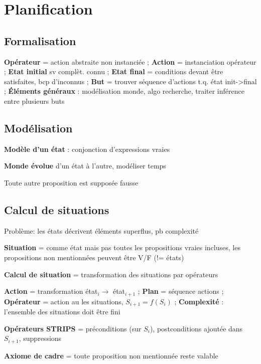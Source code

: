 \section*{Planification}

\subsection*{Formalisation}

\textbf{Opérateur} = action abstraite non instanciée
; \textbf{Action} = instanciation opérateur
; \textbf{Etat initial} sv complèt. connu
; \textbf{Etat final} = conditions devant être satisfaites, bcp d'inconnus
; \textbf{But} = trouver séquence d'actions t.q. état init->final
; \textbf{Éléments généraux} : modélisation monde, algo recherche, traiter inférence entre plusieurs buts

\subsection*{Modélisation}

\textbf{Modèle d'un état} : conjonction d'expressions vraies

\textbf{Monde évolue} d'un état à l'autre, modéliser temps

Toute autre proposition est supposée fausse

\subsection*{Calcul de situations}

Problème: les états décrivent éléments superflus, pb complexité 

\textbf{Situation} = comme état mais pas toutes les propositions vraies incluses, les propositions non mentionnées peuvent être V/F (!= états)

\textbf{Calcul de situation} = transformation des situations par opérateurs

\textbf{Action} = transformation état$_i \rightarrow$ état$_{i+1}$
; \textbf{Plan} = séquence actions
; \textbf{Opérateur} = action au les situations, $S_{i+1} = f(S_i)$
; \textbf{Complexité} : l'ensemble des situations doit être fini

\textbf{Opérateurs STRIPS} = préconditions (sur $S_i$), postconditions ajoutée dans $S_{i+1}$, suppressions 

\textbf{Axiome de cadre} = toute proposition non mentionnée reste valable 



